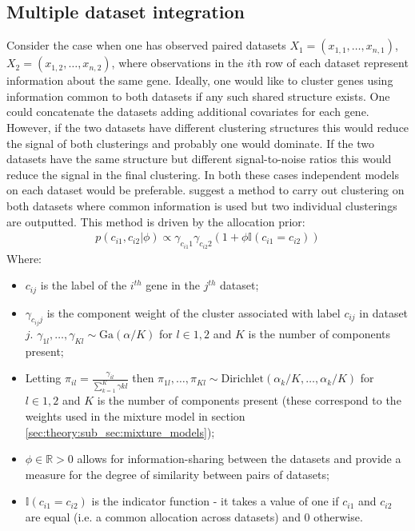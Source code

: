 \documentclass[14pt]{extarticle} %
\begin{document}
	\subsection{Multiple dataset integration}
	Consider the case when one has observed paired datasets $X_1 = (x_{1,1},\ldots,x_{n,1})$, $X_2 = (x_{1,2},\ldots,x_{n,2})$, where observations in the $i$th row of each dataset represent information about the same gene. Ideally, one would like to cluster genes using information common to both datasets if any such shared structure exists. One could concatenate the datasets adding additional covariates for each gene. However, if the two datasets have different clustering structures this would reduce the signal of both clusterings and probably one would dominate. If the two datasets have the same structure but different signal-to-noise ratios this would reduce the signal in the final clustering. In both these cases independent models on each dataset would be preferable. \citet{KirkBayesiancorrelatedclustering2012} suggest a method to carry out clustering on both datasets where common information is used but two individual clusterings are outputted. This method is driven by the allocation prior:
	\begin{align} \label{allocation_prior_l_2}
	p(c_{i1}, c_{i2} | \phi ) \propto \gamma_{c_{i1}1} \gamma_{c_{i2}2} (1 + \phi \mathbb{I}(c_{i1} = c_{i2}))
	\end{align}
	Where:
	\begin{itemize}
		\item $c_{ij}$ is the label of the $i^{th}$ gene in the $j^{th}$ dataset;
		\item $\gamma_{c_{ij}j}$ is the component weight of the cluster associated with label $c_{ij}$ in dataset $j$. $\gamma_{1l},\ldots,\gamma_{Kl} \sim \text{Ga}(\alpha / K)$ for $l \in {1,2}$ and $K$ is the number of components present;
		\item Letting $\pi_{il} = \frac{\gamma_{il}}{\sum_{k=1}^K \gamma{kl}}$ then $\pi_{1l},\ldots,\pi_{Kl} \sim \text{Dirichlet}(\alpha_k / K, \ldots, \alpha_k / K)$ for $l \in {1,2}$ and $K$ is the number of components present (these correspond to the weights used in the mixture model in section \ref{sec:theory:sub_sec:mixture_models});
		\item $\phi \in \mathbb{R} > 0$  allows for information-sharing between the datasets and provide  a  measure for the degree of similarity between pairs of datasets;
		\item $\mathbb{I}(c_{i1} = c_{i2})$ is the indicator function - it takes a value of one if $c_{i1}$ and $c_{i2}$ are equal (i.e. a common allocation across datasets) and 0 otherwise.
	\end{itemize}
\end{document}
